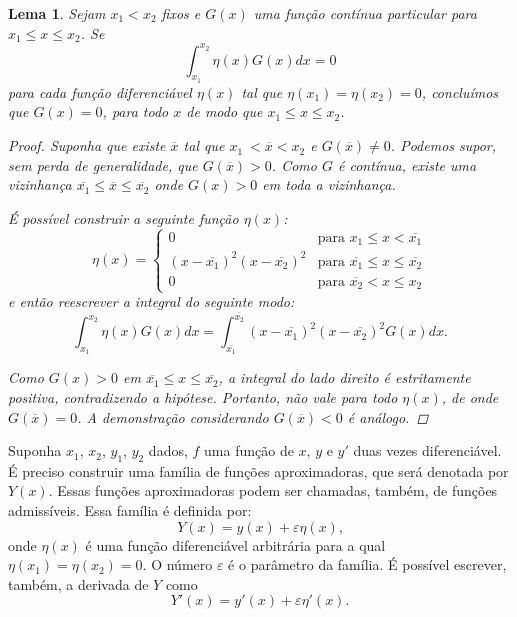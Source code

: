 \documentclass[
	12pt,				%
	openright,			%
    twoside,			%
	a4paper,			%
	english,			%
	french,				%
	spanish,			%
	brazil				%
	]{abntex2}
\newtheorem{lema}{Lema}
\numberwithin{lema}{chapter}
\numberwithin{teorema}{chapter}
\numberwithin{definicao}{chapter}
\numberwithin{figure}{chapter}
\begin{document}
\begin{lema}
\label{lema:cap_calcvar_lema_1}
Sejam $x_1 < x_2$ fixos e $G(x)$ uma função contínua particular para $x_1 \leqslant x \leqslant x_2$. Se $$\int_{x_1}^{x_2} \eta (x) G(x) dx = 0$$
para cada função diferenciável $\eta (x)$ tal que $\eta (x_1)=\eta (x_2)=0$, concluímos que $G(x)=0$, para todo $x$ de modo que $x_1 \leqslant x \leqslant x_2$.

\begin{proof}
Suponha que existe $\overline{x}$ tal que $x_1\ < \overline{x} < x_2$ e $G(\overline{x})\neq 0$. Podemos supor, sem perda de generalidade, que $G(\overline{x})>0$. Como $G$ é contínua, existe uma vizinhança $\overline{x_1} \leqslant \overline{x} \leqslant \overline{x_2}$ onde $G(x)>0$ em toda a vizinhança.

É possível construir a seguinte função $\eta (x)$:
$$
\eta (x) = 
	\begin{cases}
		0 											& \mbox{para } x_1 \leqslant x < \overline{x_1}\\
		(x-\overline{x_1})^2(x-\overline{x_2})^2	& \mbox{para } \overline{x_1} \leqslant x \leqslant \overline{x_2}\\
		0											& \mbox{para } \overline{x_2} < x \leqslant x_2
	\end{cases}
$$
e então reescrever a integral do seguinte modo:
$$\int_{x_1}^{x_2}\eta (x) G(x)dx =\int_{\overline{x_1}}^{\overline{x_2}}(x-\overline{x_1})^2(x-\overline{x_2})^2G(x)dx\text{.}$$

Como $G(x) > 0$ em $\overline{x_1} \leqslant x \leqslant \overline{x_2}$, a integral do lado direito é estritamente positiva, contradizendo a hipótese. Portanto, não vale para todo $\eta (x)$, de onde $G(\overline{x})=0$. A demonstração considerando $G(\overline{x})<0$ é análogo.
\end{proof}
\end{lema}

Suponha $x_1$, $x_2$, $y_1$, $y_2$ dados, $f$ uma função de $x$, $y$ e $y'$ duas vezes diferenciável. É preciso construir uma família de funções aproximadoras, que será denotada por $Y(x)$. Essas funções aproximadoras podem ser chamadas, também, de funções admissíveis. Essa família é definida por:
\begin{equation}\label{eqn:cap_calcvar_eq_approx}
	Y(x)=y(x)+\varepsilon \eta (x)\text{,}
\end{equation}
onde $\eta (x)$ é uma função diferenciável arbitrária para a qual $\eta (x_1)=\eta (x_2) = 0$. O número $\varepsilon$ é o parâmetro da família. É possível escrever, também, a derivada de $Y$ como
\begin{equation}\label{eqn:cap_calcvar_eq_approx_diff}
	Y'(x)=y'(x)+\varepsilon \eta '(x)\text{.}
\end{equation}
\end{document}
